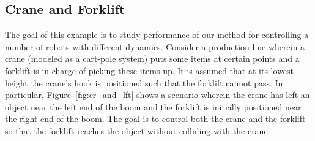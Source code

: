 %





\subsection{Crane and Forklift}
The goal of this example is to study performance of our method for controlling a number of robots with different dynamics. Consider a production line wherein a crane (modeled as a cart-pole system) puts some items at certain points and a forklift is in charge of picking these items up. It is assumed that at its lowest height the crane's hook is positioned such that the forklift cannot pass. In particular, Figure~\ref{fig:cr_and_lft} shows a scenario wherein the crane has left an object near the left end of the boom and the forklift is initially positioned near the right end of the boom. The goal is to control both the crane and the forklift so that the forklift reaches the object without colliding with the crane. 


